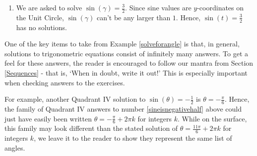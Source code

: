 \documentclass{ximera}
\begin{document}
\begin{example}
\begin{explanation}
\begin{enumerate}
\begin{image}
\end{image}

While, technically speaking, $\frac{\pi}{2}$ isn't a reference angle (it's not acute), we can nonetheless use it to find our answers.  If we follow the procedure set forth in the previous examples, we find $\beta = \frac{\pi}{2} + 2\pi k$ and $\beta = \frac{3\pi}{2} + 2\pi k$ for integers, $k$. While this solution is correct, it can be shortened to $\beta = \frac{\pi}{2} + \pi k$ for integers $k$.  The reader is encouraged to see the geometry using the diagram above on the left.

\item  We are asked to solve $\sin(\gamma) = \frac{3}{2}$.   Since sine values are $y$-coordinates on the Unit Circle, $\sin(\gamma)$ can't be any larger than $1$.  Hence, $\sin(t) = \frac{3}{2}$ has no solutions. 

\end{enumerate}

\end{explanation}

\end{example}

One of the key items to take from Example \ref{solveforangle} is that, in general, solutions to trigonometric equations consist of infinitely many answers.  To get a feel for these answers, the reader is encouraged to follow our mantra from Section \ref{Sequences} - that is, `When in doubt, write it out!'   This is especially important when checking answers to the exercises.  



 For example, another Quadrant IV solution to $\sin(\theta) = -\frac{1}{2}$ is $\theta = -\frac{\pi}{6}$.  Hence, the family of Quadrant IV answers to number \ref{sineisnegativehalf} above could just have easily been written $\theta = -\frac{\pi}{6} + 2\pi k$ for integers $k$.  While on the surface, this family may look different than the stated solution of $\theta = \frac{11\pi}{6} + 2\pi k$ for integers $k$, we leave it to the reader to show they represent the same list of angles.
\end{document}
